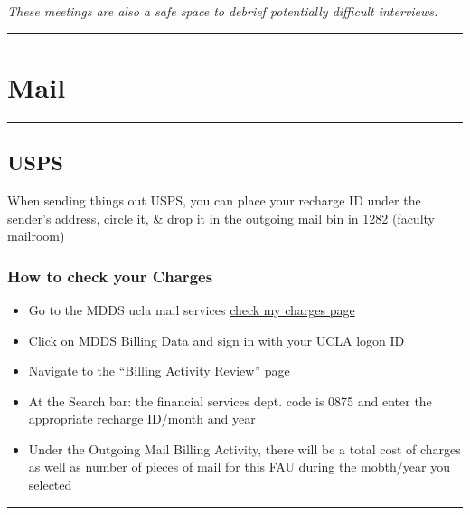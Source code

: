 \documentclass[]{book}
\providecommand{\tightlist}{%
  \setlength{\itemsep}{0pt}\setlength{\parskip}{0pt}}
\begin{document}
\emph{These meetings are also a safe space to debrief potentially difficult interviews.}

\begin{center}\rule{0.5\linewidth}{0.5pt}\end{center}

\hypertarget{mail}{%
\section{Mail}\label{mail}}

\begin{center}\rule{0.5\linewidth}{0.5pt}\end{center}

\hypertarget{usps}{%
\subsection{USPS}\label{usps}}

When sending things out USPS, you can place your recharge ID under the sender's address, circle it, \& drop it in the outgoing mail bin in 1282 (faculty mailroom)

\hypertarget{how-to-check-your-charges}{%
\subsubsection{How to check your Charges}\label{how-to-check-your-charges}}

\begin{itemize}
\tightlist
\item
  Go to the MDDS ucla mail services \href{https://www.mdds.ucla.edu/mail-services/how-to-check-your-ucla-mail-service-charges}{check my charges page}
\item
  Click on MDDS Billing Data and sign in with your UCLA logon ID
\item
  Navigate to the ``Billing Activity Review'' page
\item
  At the Search bar: the financial services dept. code is 0875 and enter the appropriate recharge ID/month and year
\item
  Under the Outgoing Mail Billing Activity, there will be a total cost of charges as well as number of pieces of mail for this FAU during the mobth/year you selected
\end{itemize}

\begin{center}\rule{0.5\linewidth}{0.5pt}\end{center}
\end{document}
